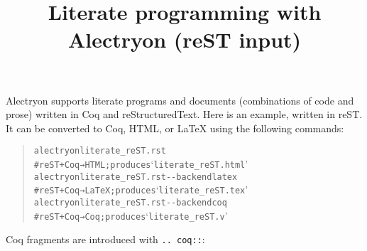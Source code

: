 \documentclass[a4paper]{article}
\providecommand*{\DUtransition}{%
  \hspace*{\fill}\hrulefill\hspace*{\fill}
  \vskip 0.5\baselineskip
}
\begin{document}
\title{Literate programming with Alectryon (reST input)%
  \label{literate-programming-with-alectryon-rest-input}}
\author{}
\date{}
\maketitle

\makeatletter\def\alectryon@nobreakspace{\alectryon@breakspace}\makeatother

Alectryon supports literate programs and documents (combinations of code and prose) written in Coq and reStructuredText.  Here is an example, written in reST.  It can be converted to Coq, HTML, or LaTeX using the following commands:

\begin{quote}
\begin{alltt}
alectryon literate_reST.rst
  # reST+Coq → HTML;  produces ‘literate_reST.html’
alectryon literate_reST.rst -{}-backend latex
  # reST+Coq → LaTeX; produces ‘literate_reST.tex’
alectryon literate_reST.rst -{}-backend coq
  # reST+Coq → Coq;   produces ‘literate_reST.v’
\end{alltt}
\end{quote}

\DUtransition

Coq fragments are introduced with \texttt{.. coq::}:
\end{document}
